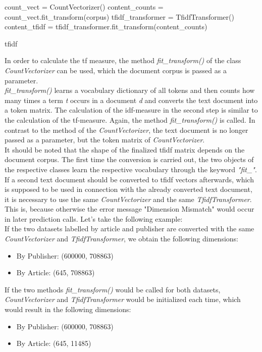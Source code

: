 \documentclass[a4paper, 11pt,titlepage,oneside,openany]{book}
\begin{document}
\newpage
\begin{algorithm}[H]
	\DontPrintSemicolon
	count\_vect = CountVectorizer()\;
	content\_counts = count\_vect.fit\_transform(corpus)\;
	\BlankLine
	tfidf\_transformer = TfidfTransformer()\;
	content\_tfidf = tfidf\_transformer.fit\_transform(content\_counts)\;
	\caption{\gls{tfidf}}
\end{algorithm}
\noindent In order to calculate the \gls{tf} measure, the method \textit{fit\_transform()} of the class \textit{CountVectorizer} can be used, which the document corpus is passed as a parameter. \\
\noindent \textit{fit\_transform()} learns a vocabulary dictionary of all tokens and then counts how many times a term \textit{t} occurs in a document \textit{d} and converts the text document into a token matrix.
\noindent The calculation of the \gls{idf}-measure in the second step is similar to the calculation of the \gls{tf}-measure. Again, the method \textit{fit\_transform()} is called. In contrast to the method of the \textit{CountVectorizer}, the text document is no longer passed as a parameter, but the token matrix of \textit{CountVectorizer}. \\
\noindent It should be noted that the shape of the finalized \gls{tfidf} matrix depends on the document corpus. The first time the conversion is carried out, the two objects of the respective classes learn the respective vocabulary through the keyword \textit{"fit\_"}. If a second text document should be converted to \gls{tfidf} vectors afterwards, which is supposed to be used in connection with the already converted text document, it is necessary to use the same \textit{CountVectorizer} and the same \textit{TfidfTransformer}. This is, because otherwise the error message "Dimension Mismatch" would occur in later prediction calls.
Let's take the following example: \\
\noindent If the two datasets labelled by article and publisher are converted with the same \textit{CountVectorizer} and \textit{TfidfTransformer}, we obtain the following dimensions:
\begin{itemize}
	\item By Publisher: (600000, 708863)
	\item By Article: (645, 708863)	
\end{itemize}

\noindent If the two methods \textit{fit\_transform()} would be called for both datasets, \textit{CountVectorizer} and \textit{TfidfTransformer} would be initialized each time, which would result in the following dimensions:
\begin{itemize}
	\item By Publisher: (600000, 708863)
	\item By Article: (645, 11485)	
\end{itemize}
\end{document}
